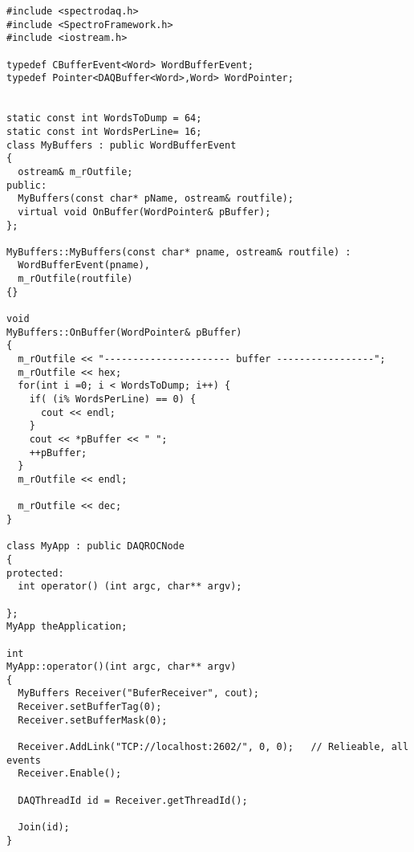 \footnotesize\begin{verbatim}#include <spectrodaq.h>
#include <SpectroFramework.h>
#include <iostream.h>

typedef CBufferEvent<Word> WordBufferEvent;
typedef Pointer<DAQBuffer<Word>,Word> WordPointer;


static const int WordsToDump = 64;
static const int WordsPerLine= 16;
class MyBuffers : public WordBufferEvent
{
  ostream& m_rOutfile;
public:
  MyBuffers(const char* pName, ostream& routfile);
  virtual void OnBuffer(WordPointer& pBuffer);
};

MyBuffers::MyBuffers(const char* pname, ostream& routfile) :
  WordBufferEvent(pname),
  m_rOutfile(routfile)
{}

void
MyBuffers::OnBuffer(WordPointer& pBuffer)
{
  m_rOutfile << "---------------------- buffer -----------------";
  m_rOutfile << hex;
  for(int i =0; i < WordsToDump; i++) {
    if( (i% WordsPerLine) == 0) {
      cout << endl;
    }
    cout << *pBuffer << " ";
    ++pBuffer;
  }
  m_rOutfile << endl;

  m_rOutfile << dec;
}

class MyApp : public DAQROCNode
{
protected:
  int operator() (int argc, char** argv);

};
MyApp theApplication;

int
MyApp::operator()(int argc, char** argv)
{
  MyBuffers Receiver("BuferReceiver", cout);
  Receiver.setBufferTag(0);
  Receiver.setBufferMask(0);
  
  Receiver.AddLink("TCP://localhost:2602/", 0, 0);   // Relieable, all events
  Receiver.Enable();
  
  DAQThreadId id = Receiver.getThreadId();
  
  Join(id);
}

\end{verbatim}\normalsize 


